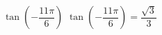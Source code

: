 {$\tan \left( -\dfrac{11\pi}{6} \right)$}
{$\tan \left( -\dfrac{11\pi}{6} \right) = \dfrac{\sqrt{3}}{3}$}
